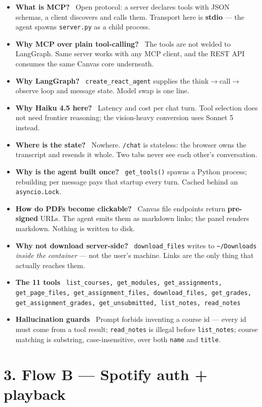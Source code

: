 \documentclass[10pt]{article}
\newcommand{\qa}[2]{\item \textbf{#1} \, #2}
\newcommand{\code}[1]{\texttt{\small #1}}
\begin{document}
\begin{itemize}
\qa{What is MCP?}{Open protocol: a server declares tools with JSON schemas, a client discovers and calls them. Transport here is \textbf{stdio} --- the agent spawns \code{server.py} as a child process.}
\qa{Why MCP over plain tool-calling?}{The tools are not welded to LangGraph. Same server works with any MCP client, and the REST API consumes the same Canvas core underneath.}
\qa{Why LangGraph?}{\code{create\_react\_agent} supplies the think$\to$call$\to$observe loop and message state. Model swap is one line.}
\qa{Why Haiku 4.5 here?}{Latency and cost per chat turn. Tool selection does not need frontier reasoning; the vision-heavy conversion uses Sonnet 5 instead.}
\qa{Where is the state?}{Nowhere. \code{/chat} is stateless: the browser owns the transcript and resends it whole. Two tabs never see each other's conversation.}
\qa{Why is the agent built once?}{\code{get\_tools()} spawns a Python process; rebuilding per message pays that startup every turn. Cached behind an \code{asyncio.Lock}.}
\qa{How do PDFs become clickable?}{Canvas file endpoints return \textbf{pre-signed} URLs. The agent emits them as markdown links; the panel renders markdown. Nothing is written to disk.}
\qa{Why not download server-side?}{\code{download\_files} writes to \code{\textasciitilde/Downloads} \emph{inside the container} --- not the user's machine. Links are the only thing that actually reaches them.}
\qa{The 11 tools}{\code{list\_courses, get\_modules, get\_assignments, get\_page\_files, get\_assignment\_files, download\_files, get\_grades, get\_assignment\_grades, get\_unsubmitted, list\_notes, read\_notes}}
\qa{Hallucination guards}{Prompt forbids inventing a course id --- every id must come from a tool result; \code{read\_notes} is illegal before \code{list\_notes}; course matching is substring, case-insensitive, over both \code{name} and \code{title}.}
\end{itemize}

\section*{3. Flow B --- Spotify auth + playback}
\end{document}
